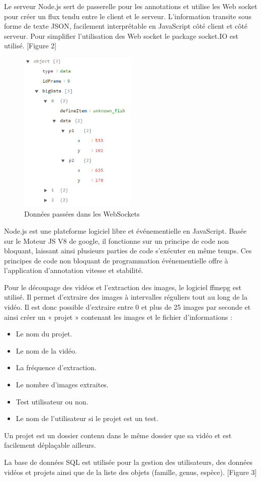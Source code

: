 \documentclass[12pt]{article}
\begin{document}
Le serveur Node.js sert de passerelle pour les annotations et utilise les Web socket pour créer un flux tendu entre le client et le serveur. L’information transite sous forme de texte JSON, facilement interprétable en JavaScript côté client et côté serveur. Pour simplifier l’utilisation des Web socket le package socket.IO est utilisé.
[Figure 2]
\newpage
\begin{figure}[H]
\centering
\includegraphics[width=0.5\textwidth]{img/infoFrameData.png}
 \caption{Données passées dans les WebSockets}
 \label{fig:donnee_websockets}
\end{figure}
Node.js est une plateforme logiciel libre et événementielle en JavaScript. Basée sur le Moteur JS V8 de google, il fonctionne sur un principe de code non bloquant, laissant ainsi plusieurs parties de code s'exécuter en même temps. Ces principes de code non bloquant de programmation événementielle offre à l'application d'annotation vitesse et stabilité.

\par
Pour le découpage des vidéos et l’extraction des images, le logiciel ffmepg est utilisé. Il permet d’extraire des images à intervalles réguliers tout au long de la vidéo. Il est donc possible d’extraire entre 0 et plus de 25 images par seconde et ainsi créer un « projet » contenant les images et le fichier d’informations :

\begin{itemize}
    \item Le nom du projet.
    \item Le nom de la vidéo.
    \item La fréquence d’extraction.
    \item Le nombre d’images extraites.
    \item Test utilisateur ou non.
    \item Le nom de l’utilisateur si le projet est un test.
\end{itemize}
Un projet est un dossier contenu dans le même dossier que sa vidéo et est facilement déplaçable ailleurs.
\par
La base de données SQL est utilisée pour la gestion des utilisateurs, des données vidéos et projets ainsi que de la liste des objets (famille, genus, espèce). [Figure 3]
\end{document}
